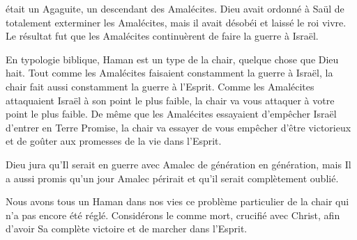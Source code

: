  était un Agaguite, un descendant des Amalécites.
 Dieu avait ordonné à Saül de totalement exterminer les Amalécites,
 mais il avait désobéi et laissé le roi vivre.
 Le résultat fut que les Amalécites continuèrent de faire la guerre à Israël.

En typologie
 biblique, Haman est un type de la chair,
 quelque chose que Dieu hait.
 Tout comme les Amalécites faisaient constamment la guerre à Israël,
 la chair fait aussi constamment la guerre à l'Esprit.
 Comme les Amalécites attaquaient Israël à son point le plus faible,
 la chair va vous attaquer à votre point le plus faible.
 De même que les Amalécites essayaient d'empêcher Israël
 d'entrer en Terre Promise, la chair va essayer de vous empêcher
 d'être victorieux et de goûter aux promesses de la vie dans l'Esprit.

Dieu jura qu'Il serait en guerre avec Amalec de génération en génération,
 mais Il a aussi promis qu'un jour Amalec périrait et
 qu'il serait complètement oublié.


Nous avons tous un Haman dans nos vies
 \ocadr{}ce problème particulier de la chair
 qui n'a pas encore été réglé.
 Considérons le comme mort, crucifié avec Christ,
 afin d'avoir Sa complète victoire et de marcher dans l'Esprit.

\dvrule







